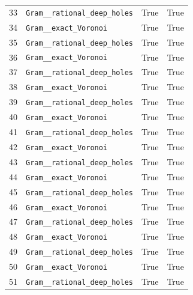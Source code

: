 \documentclass[12pt]{amsart}
\theoremstyle{remark}
\theoremstyle{definition}
\numberwithin{equation}{section}
\begin{document}
\begin{longtable}{rL{11cm}cc}
33 & \texttt{Gram\_\_\allowbreak rational\_\allowbreak deep\_\allowbreak holes} & True & True \\
34 & \texttt{Gram\_\_\allowbreak exact\_\allowbreak Voronoi} & True & True \\
35 & \texttt{Gram\_\_\allowbreak rational\_\allowbreak deep\_\allowbreak holes} & True & True \\
36 & \texttt{Gram\_\_\allowbreak exact\_\allowbreak Voronoi} & True & True \\
37 & \texttt{Gram\_\_\allowbreak rational\_\allowbreak deep\_\allowbreak holes} & True & True \\
38 & \texttt{Gram\_\_\allowbreak exact\_\allowbreak Voronoi} & True & True \\
39 & \texttt{Gram\_\_\allowbreak rational\_\allowbreak deep\_\allowbreak holes} & True & True \\
40 & \texttt{Gram\_\_\allowbreak exact\_\allowbreak Voronoi} & True & True \\
41 & \texttt{Gram\_\_\allowbreak rational\_\allowbreak deep\_\allowbreak holes} & True & True \\
42 & \texttt{Gram\_\_\allowbreak exact\_\allowbreak Voronoi} & True & True \\
43 & \texttt{Gram\_\_\allowbreak rational\_\allowbreak deep\_\allowbreak holes} & True & True \\
44 & \texttt{Gram\_\_\allowbreak exact\_\allowbreak Voronoi} & True & True \\
45 & \texttt{Gram\_\_\allowbreak rational\_\allowbreak deep\_\allowbreak holes} & True & True \\
46 & \texttt{Gram\_\_\allowbreak exact\_\allowbreak Voronoi} & True & True \\
47 & \texttt{Gram\_\_\allowbreak rational\_\allowbreak deep\_\allowbreak holes} & True & True \\
48 & \texttt{Gram\_\_\allowbreak exact\_\allowbreak Voronoi} & True & True \\
49 & \texttt{Gram\_\_\allowbreak rational\_\allowbreak deep\_\allowbreak holes} & True & True \\
50 & \texttt{Gram\_\_\allowbreak exact\_\allowbreak Voronoi} & True & True \\
51 & \texttt{Gram\_\_\allowbreak rational\_\allowbreak deep\_\allowbreak holes} & True & True \\

\end{longtable}
\end{document}
